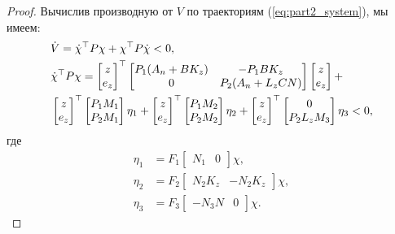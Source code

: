 \begin{proof}
Вычислив производную от $V$ по траекториям (\ref{eq:part2_system}), мы имеем:
\begin{align}
	& \dot{V} = \dot{\chi}^\top {P} \chi + \chi^\top {P} \dot{\chi} < 0,\\
	& \nonumber \dot{\chi}^\top {P} \chi = 
	\begin{bmatrix}
		{z} \\
		e_z
	\end{bmatrix}^\top
	\begin{bmatrix}
		{P}_1({A}_n + {B}{K}_z)
		&
		-{P}_1 {B}{K}_z
		\\
		0
		&
		{P}_2({A}_n + {L}_z {C}N)
	\end{bmatrix}
	\begin{bmatrix}
		{z} \\
		e_z
	\end{bmatrix}
	+
	\\
	&\begin{bmatrix}
		{z} \\
		e_z
	\end{bmatrix}^\top
	\begin{bmatrix}
	{P}_1 {M}_1 \\ {P}_2 {M}_1
	\end{bmatrix}
	\eta _1
	+
	\begin{bmatrix}
		{z} \\
		e_z
	\end{bmatrix}^\top
	\begin{bmatrix}
		{P}_1 {M}_2 \\ {P}_2 {M}_2
	\end{bmatrix}
	\eta_2
	+
	\begin{bmatrix}
		{z} \\
		e_z
	\end{bmatrix}^\top
	\begin{bmatrix}
		0 \\ {P}_2 {L}_z M_3
	\end{bmatrix}
	\eta_3
	< 0,
\end{align}
где
%
\begin{align}
	\eta_1&={F}_1\begin{bmatrix}
		{N}_1 &0
	\end{bmatrix}\chi ,\\
	\eta_2&={F}_2\begin{bmatrix}
		{N}_2{K}_z & -{N}_2{K}_z
	\end{bmatrix}\chi, \\
	\label{eq:eta_3_thm3}
	\eta_3&={F}_3\begin{bmatrix}
		-{N}_3{N} & 0
	\end{bmatrix}\chi.

\end{align}
\end{proof}
